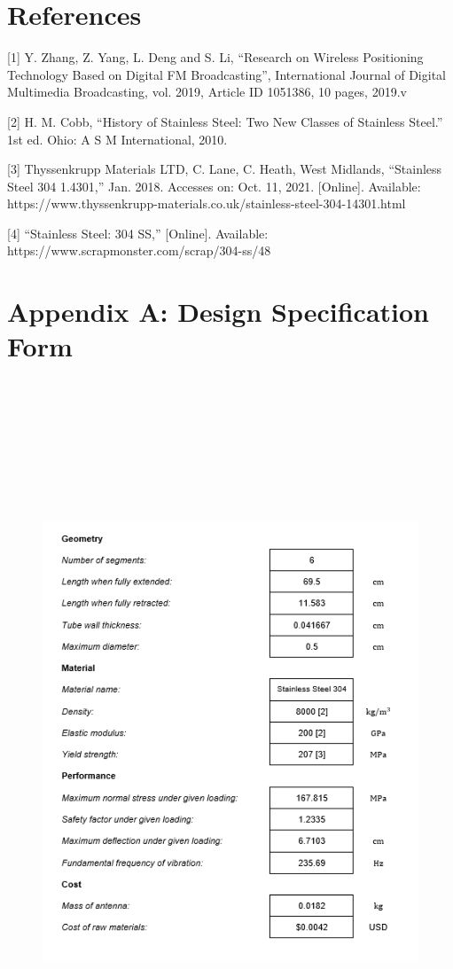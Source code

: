 \documentclass[12pt]{article}
\begin{document}
\section{References}
[1] Y. Zhang, Z. Yang, L. Deng and S. Li, “Research on Wireless Positioning Technology Based on Digital FM Broadcasting”, International Journal of Digital
Multimedia Broadcasting, vol. 2019, Article ID 1051386, 10 pages, 2019.v

[2] H. M. Cobb, “History of Stainless Steel: Two New Classes
of Stainless Steel.” 1st ed. Ohio: A S M International, 2010.

[3] Thyssenkrupp Materials LTD, C. Lane, C. Heath, West    Midlands, “Stainless Steel 304 1.4301,” Jan. 2018. Accesses on: Oct. 11, 2021. [Online]. Available:          https://www.thyssenkrupp-materials.co.uk/stainless-steel-304-14301.html

[4] “Stainless Steel: 304 SS,” [Online]. Available: https://www.scrapmonster.com/scrap/304-ss/48
\newpage

\section{Appendix A: Design Specification Form}
\begin{figure}[H] 
\includegraphics[height= 21.5cm, width= 17.5cm]{Appendix_A.png}
\end{figure}
\newpage
\end{document}

